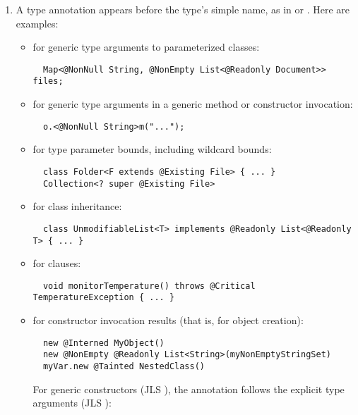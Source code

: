 \documentclass[10pt]{article}
\newcommand{\preverbnegspace}{\vspace{-5pt}}
\begin{document}
\begin{enumerate}
\item
  A type annotation appears before the type's simple name, as in 
  or .
%
  Here are examples:
\begin{itemize}
\item for generic type arguments to parameterized classes:
\preverbnegspace
\begin{Verbatim}
  Map<@NonNull String, @NonEmpty List<@Readonly Document>> files;
\end{Verbatim}

\item for generic type arguments in a generic method or constructor invocation:
\preverbnegspace
\begin{Verbatim}
  o.<@NonNull String>m("...");
\end{Verbatim}

\item for type parameter bounds, including wildcard bounds:
\preverbnegspace
\begin{Verbatim}
  class Folder<F extends @Existing File> { ... }
  Collection<? super @Existing File>
\end{Verbatim}

\item for class inheritance:
\preverbnegspace
\begin{Verbatim}
  class UnmodifiableList<T> implements @Readonly List<@Readonly T> { ... }
\end{Verbatim}

\item for  clauses:
\preverbnegspace
\begin{Verbatim}
  void monitorTemperature() throws @Critical TemperatureException { ... }
\end{Verbatim}

\item for constructor invocation results (that is, for object creation):

\preverbnegspace
\begin{Verbatim}
  new @Interned MyObject()
  new @NonEmpty @Readonly List<String>(myNonEmptyStringSet)
  myVar.new @Tainted NestedClass()
\end{Verbatim}
\preverbnegspace

For generic constructors (JLS ), the
annotation follows the explicit type arguments (JLS
):


\end{itemize}
\end{enumerate}
\end{document}
